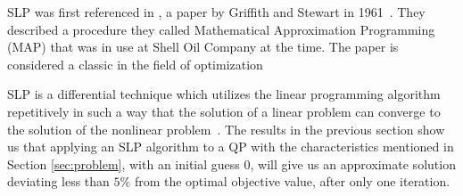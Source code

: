 SLP was first referenced in \cite{slp61}, a paper by Griffith and Stewart in
1961~\cite{boggs1985numerical}.
They described a procedure they called Mathematical Approximation Programming
(MAP) that was in use at Shell Oil Company at the time. The paper is considered
a classic in the field of optimization

SLP is a differential technique which utilizes the linear programming algorithm
repetitively in such a way that the solution of a linear problem can converge
to the solution of the nonlinear problem~\cite{slp61}.
The results in the previous section show
us that applying an SLP algorithm to a QP with the characteristics mentioned in
Section \ref{sec:problem}, with an initial guess 0, will give us an approximate
solution deviating less than $5\%$ from the optimal objective value, after
only one iteration.
